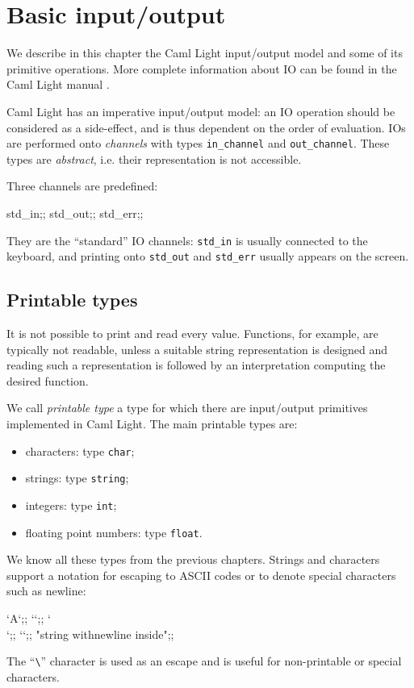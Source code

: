 \chapter{Basic input/output}
\label{c:basicio}

We describe in this chapter the Caml Light input/output model and some
of its primitive operations. More complete information about IO can
be found in the Caml Light manual \cite{CamlLightDoc}.

Caml Light has an imperative input/output model: an IO operation
should be considered as a side-effect, and is thus dependent on the
order of evaluation. IOs are performed onto {\em channels} with types
\verb|in_channel| and \verb|out_channel|. These types are {\em
abstract}, i.e. their representation is not accessible.

Three channels are predefined:
\begin{caml_example}
std_in;;
std_out;;
std_err;;
\end{caml_example}
They are the ``standard'' IO channels: \verb|std_in| is usually
connected to the keyboard, and printing onto \verb|std_out| and
\verb|std_err| usually appears on the screen.

\section{Printable types}

It is not possible to print and read every value. Functions, for
example, are typically not readable, unless a suitable string
representation is designed and reading such a representation
is followed by an interpretation computing the desired function.

We call {\em printable type} a type for which there are input/output
primitives implemented in Caml Light. The main printable types are:
\begin{itemize}
\item characters: type \verb|char|;
\item strings: type \verb|string|;
\item integers: type \verb|int|;
\item floating point numbers: type \verb|float|.
\end{itemize}
We know all these types from the previous chapters. Strings and
characters support a notation for escaping to ASCII codes or to
denote special characters such as newline:
\begin{caml_example}
`A`;;
``;;
`\\`;;
`\n`;;
"string with\na newline inside";;
\end{caml_example}
The ``\verb|\|'' character is used as an escape and is
useful for non-printable or special characters.

